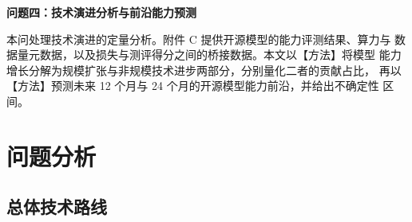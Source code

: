 \documentclass[bwprint]{gmcmthesis}
\numberwithin{equation}{section}
\numberwithin{figure}{section}
\numberwithin{table}{section}
\begin{document}
\textbf{问题四：技术演进分析与前沿能力预测}

本问处理技术演进的定量分析。附件 C 提供开源模型的能力评测结果、算力与
数据量元数据，以及损失与测评得分之间的桥接数据。本文以【方法】将模型
能力增长分解为规模扩张与非规模技术进步两部分，分别量化二者的贡献占比，
再以【方法】预测未来 12 个月与 24 个月的开源模型能力前沿，并给出不确定性
区间。


\section{问题分析}

%
%

\subsection{总体技术路线}

\end{document}
